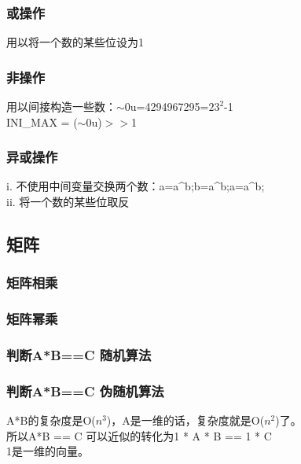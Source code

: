 \documentclass[a4paper]{article}
\begin{document}
\begin{CJK*}{UTF8}{gbsn}
\begin{multicols}{3}
\begin{flushleft}
\subsubsection{或操作}
用以将一个数的某些位设为1\\

\subsubsection{非操作}
用以间接构造一些数：$\sim$0u=4294967295=$23^2$-1\\
INI\_MAX = ($\sim$0u)$>$$>$1\\


\subsubsection{异或操作}
i. 不使用中间变量交换两个数：a=a\^{}b;b=a\^{}b;a=a\^{}b; \\
ii. 将一个数的某些位取反\\



\subsection{矩阵}



\subsubsection{矩阵相乘}


\subsubsection{矩阵幂乘}


\subsubsection{判断A*B==C 随机算法}


\subsubsection{判断A*B==C 伪随机算法}
A*B的复杂度是O($n^3$)，A是一维的话，复杂度就是O($n^2$)了。\\
所以A*B == C 可以近似的转化为1 * A * B == 1 * C\\
1是一维的向量。\\


\end{flushleft}
\end{multicols}
\end{CJK*}
\end{document}
